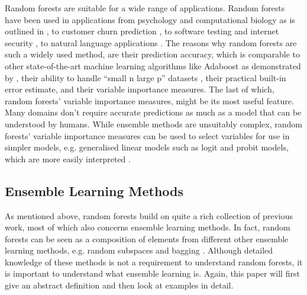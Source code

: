 \documentclass[a4paper,man,12pt,apacite,floatsintext,draftfirst]{apa6} %
\begin{document}
Random forests are suitable for a wide range of applications.
Random forests have been used in applications from psychology and
computational biology as is outlined in ,
to customer churn prediction \cite{xie2009customer},
to software testing \cite{guo2004robust} and internet security
\cite{zhang2005network}, to natural language applications
\cite{xu2004random, kobylinski2008definition}.
The reasons why random forests are such a widely used method,
are their prediction accuracy, which is comparable to other state-of-the-art
machine learning algorithms like Adaboost as demonstrated
by ,
their ability to handle “small n large p” datasets \cite{strobl2009introduction},
their practical built-in error estimate, and their variable importance measures.
The last of which, random forests' variable importance measures,
might be its most useful feature.
Many domains don't require accurate predictions as much as a model that can
be understood by humans.
While ensemble methods are unsuitably complex,
random forests' variable importance measures can be used to select variables
for use in simpler models, e.g.
generalised linear models such as logit and probit models,
which are more easily interpreted \cite{strobl2009introduction}.

\subsection{Ensemble Learning Methods}
As mentioned above, random forests build on quite a rich collection of
previous work, most of which also concerns ensemble learning methods.
In fact, random forests can be seen as a composition of elements from
different other ensemble learning methods, e.g.
random subspaces \cite{ho1998random} and bagging \cite{breiman1996bagging}.
Although detailed knowledge of these methods is not a requirement to
understand random forests, it is important to understand what
ensemble learning is.
Again, this paper will first give an abstract definition and then look at
examples in detail.
\end{document}
